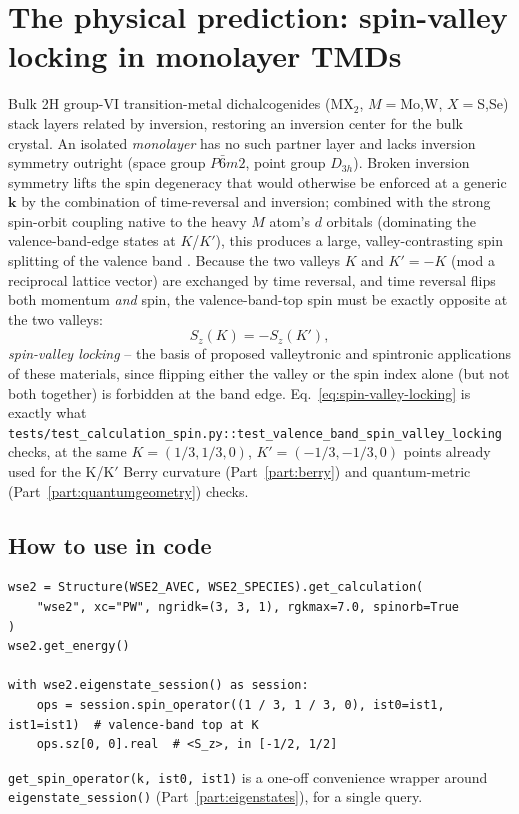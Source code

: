 \documentclass[11pt]{article}
\begin{document}
\section{The physical prediction: spin-valley locking in monolayer TMDs}

Bulk 2H group-VI transition-metal dichalcogenides (MX$_2$, $M=$Mo,W, $X=$S,Se) stack layers
related by inversion, restoring an inversion center for the bulk crystal. An isolated
\emph{monolayer} has no such partner layer and lacks inversion symmetry outright (space group
$P\bar 6m2$, point group $D_{3h}$). Broken inversion symmetry lifts the spin degeneracy that
would otherwise be enforced at a generic $\mathbf k$ by the combination of time-reversal and
inversion; combined with the strong spin-orbit coupling native to the heavy $M$ atom's $d$
orbitals (dominating the valence-band-edge states at $K$/$K'$), this produces a large,
valley-contrasting spin splitting of the valence band \cite{xiao2012}. Because the two valleys
$K$ and $K'=-K$ (mod a reciprocal lattice vector) are exchanged by time reversal, and time
reversal flips both momentum \emph{and} spin, the valence-band-top spin must be exactly
opposite at the two valleys:
\begin{equation}
  S_z(K) = -S_z(K'),
  \label{eq:spin-valley-locking}
\end{equation}
\emph{spin-valley locking} -- the basis of proposed valleytronic and spintronic applications
of these materials, since flipping either the valley or the spin index alone (but not both
together) is forbidden at the band edge. Eq.~\eqref{eq:spin-valley-locking} is exactly what
\texttt{tests/test\_calculation\_spin.py::test\_valence\_band\_spin\_valley\_locking} checks,
at the same $K=(1/3,1/3,0)$, $K'=(-1/3,-1/3,0)$ points already used for the K/K$'$ Berry
curvature (Part~\ref{part:berry}) and quantum-metric (Part~\ref{part:quantumgeometry}) checks.

\subsection{How to use in code}

\begin{verbatim}
wse2 = Structure(WSE2_AVEC, WSE2_SPECIES).get_calculation(
    "wse2", xc="PW", ngridk=(3, 3, 1), rgkmax=7.0, spinorb=True
)
wse2.get_energy()

with wse2.eigenstate_session() as session:
    ops = session.spin_operator((1 / 3, 1 / 3, 0), ist0=ist1, ist1=ist1)  # valence-band top at K
    ops.sz[0, 0].real  # <S_z>, in [-1/2, 1/2]
\end{verbatim}
\texttt{get\_spin\_operator(k, ist0, ist1)} is a one-off convenience wrapper around
\texttt{eigenstate\_session()} (Part~\ref{part:eigenstates}), for a single query.
\end{document}

